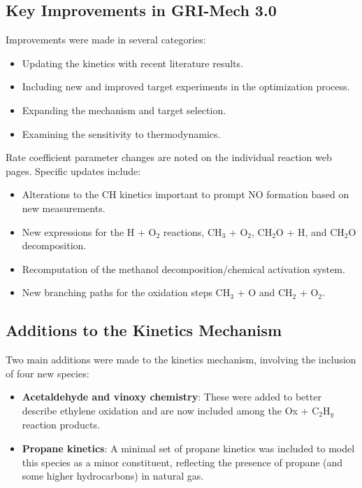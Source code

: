 \subsection*{Key Improvements in GRI-Mech 3.0}

Improvements were made in several categories:
\begin{itemize}
    \item Updating the kinetics with recent literature results.
    \item Including new and improved target experiments in the optimization process.
    \item Expanding the mechanism and target selection.
    \item Examining the sensitivity to thermodynamics.
\end{itemize}

Rate coefficient parameter changes are noted on the individual reaction web pages. Specific updates include:
\begin{itemize}
    \item Alterations to the CH kinetics important to prompt NO formation based on new measurements.
    \item New expressions for the H + O$_2$ reactions, CH$_3$ + O$_2$, CH$_2$O + H, and CH$_2$O decomposition.
    \item Recomputation of the methanol decomposition/chemical activation system.
    \item New branching paths for the oxidation steps CH$_3$ + O and CH$_2$ + O$_2$.
\end{itemize}

\subsection*{Additions to the Kinetics Mechanism}

Two main additions were made to the kinetics mechanism, involving the inclusion of four new species:
\begin{itemize}
    \item \textbf{Acetaldehyde and vinoxy chemistry}: These were added to better describe ethylene oxidation and are now included among the Ox + C$_2$H$_y$ reaction products.
    \item \textbf{Propane kinetics}: A minimal set of propane kinetics was included to model this species as a minor constituent, reflecting the presence of propane (and some higher hydrocarbons) in natural gas.
\end{itemize}

